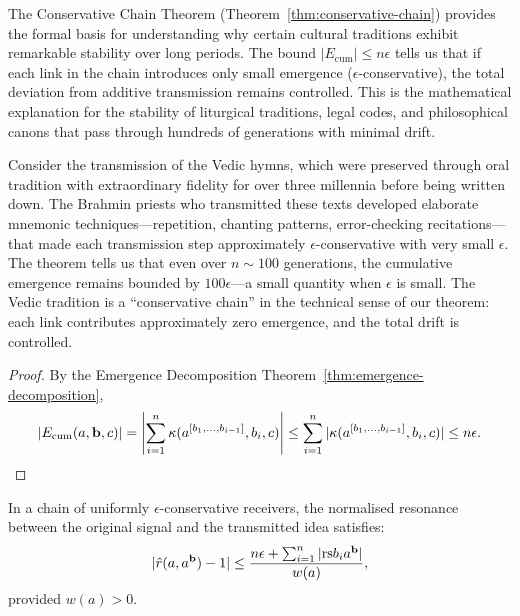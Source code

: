 \begin{interpretation}
\label{interp:ch9:conservative_chain_oral}
The Conservative Chain Theorem (Theorem~\ref{thm:conservative-chain})
provides the formal basis for understanding why certain cultural traditions
exhibit remarkable stability over long periods.  The bound
$|E_{\mathrm{cum}}| \leq n\epsilon$ tells us that if each link in the chain
introduces only small emergence ($\epsilon$-conservative), the total
deviation from additive transmission remains controlled.  This is the
mathematical explanation for the stability of liturgical traditions,
legal codes, and philosophical canons that pass through hundreds of
generations with minimal drift.

Consider the transmission of the Vedic hymns, which were preserved
through oral tradition with extraordinary fidelity for over three millennia
before being written down.  The Brahmin priests who transmitted these texts
developed elaborate mnemonic techniques---repetition, chanting patterns,
error-checking recitations---that made each transmission step approximately
$\epsilon$-conservative with very small $\epsilon$.  The theorem tells us
that even over $n \sim 100$ generations, the cumulative emergence remains
bounded by $100\epsilon$---a small quantity when $\epsilon$ is small.  The
Vedic tradition is a ``conservative chain'' in the technical sense of our
theorem: each link contributes approximately zero emergence, and the total
drift is controlled.
\end{interpretation}



\begin{proof}
By the Emergence Decomposition Theorem~\ref{thm:emergence-decomposition},
\[
  |E_{\mathrm{cum}}(a, \mathbf{b}, c)|
  = \left|
      \sum_{i=1}^{n} \kappa(a^{[b_1,\ldots,b_{i-1}]}, b_i, c)
    \right|
  \leq \sum_{i=1}^{n} |\kappa(a^{[b_1,\ldots,b_{i-1}]}, b_i, c)|
  \leq n \epsilon. \qedhere
\]
\end{proof}

\begin{corollary}
\label{cor:fidelity-decay}
In a chain of uniformly $\epsilon$-conservative receivers, the normalised
resonance between the original signal and the transmitted idea satisfies:
\[
  |\hat{r}(a, a^{\mathbf{b}}) - 1| \leq
  \frac{n\epsilon + \sum_{i=1}^{n} |\mathrm{rs}{b_i}{a^{\mathbf{b}}}|}{w(a)},
\]
provided $w(a) > 0$.
\end{corollary}

